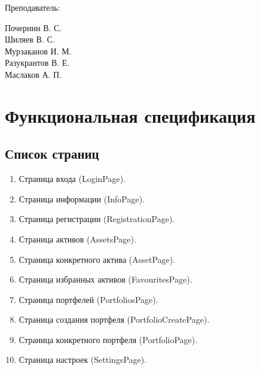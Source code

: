 \documentclass[a4paper, 14pt]{article}
\begin{document}
\begin{titlepage}
\begin{multicols}{2}
\begin{flushright}
            {Преподаватель:\\}

        \end{flushright}
        \begin{flushright}

            {Почернин В. С.}\\
            {Шиляев В. С.}\\
            {Мурзаканов И. М.}\\
            {Разукрантов В. Е.}\\[0.5cm]


            Маслаков А. П.\\

        \end{flushright}
    \end{multicols}

    \flushright{
        {\phantom{qwe}}\\[0.5cm]
    }

    \vfill
\end{titlepage}

\Large
\tableofcontents
\newpage
\large

\section{Функциональная спецификация}

\subsection{Список страниц}

\begin{enumerate}
    \item Страница входа (LoginPage).
    \item Страница информации (InfoPage).
    \item Страница регистрации (RegistrationPage).
    \item Страница активов (AssetsPage).
    \item Страница конкретного актива (AssetPage).
    \item Страница избранных активов (FavouritesPage).
    \item Страница портфелей (PortfoliosPage).
    \item Страница создания портфеля (PortfolioCreatePage).
    \item Страница конкретного портфеля (PortfolioPage).
    \item Страница настроек (SettingsPage).
\end{enumerate}
\end{document}
